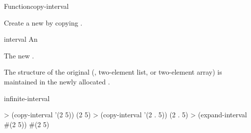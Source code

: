 \documentclass[10pt,twoside,english,pdftex]{article}
\begin{document}
\begin{functiondoc}{Function}{copy-interval}%
  {
    \returns{} }
%
%

\fnsyntax

\fnpurpose Create a new  by copying .

\fnpackage {}

\fnmodule {}

\fnargs
\begin{args}{interval}
\arg[interval] An 
\end{args}

\fnreturns The new .

\fndescription The structure of the original  (,
two-element list, or two-element array) is maintained in the newly allocated
.

\begin{alsos}{infinite-interval}
\end{alsos}

\fnexamples
%
\W\supp
\begin{example}
> (copy-interval '(2 5))
(2 5)
> (copy-interval '(2 . 5))
(2 . 5)
> (expand-interval #(2 5))
#(2 5)
\end{example}

\end{functiondoc}

\end{document}

